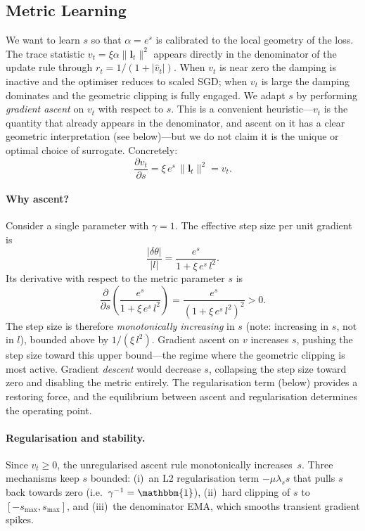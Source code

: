\documentclass{article}
\newcommand{\Id}{\mathbbm{1}}
\newcommand{\vecb}[1]{\boldsymbol{#1}}
\begin{document}
\subsection{Metric Learning}\label{sec:scalar-learning}
We want to learn $s$ so that $\alpha = e^s$ is calibrated to the local geometry of the loss.
The trace statistic $v_t = \xi\alpha\|\vecb{l}_t\|^2$ appears directly in the denominator
of the update rule through $r_t = 1/(1+|\hat{v}_t|)$.
When $v_t$ is near zero the damping is inactive and the optimiser reduces to scaled SGD;
when $v_t$ is large the damping dominates and the geometric clipping is fully engaged.
We adapt $s$ by performing \emph{gradient ascent} on $v_t$ with respect to $s$.
This is a convenient heuristic---$v_t$ is the quantity that already appears in the denominator,
and ascent on it has a clear geometric interpretation (see below)---but
we do not claim it is the unique or optimal choice of surrogate.
Concretely:
$$
    \frac{\partial v_t}{\partial s} = \xi\,e^s\,\|\vecb{l}_t\|^2 = v_t.
$$

\paragraph{Why ascent?}
Consider a single parameter with $\gamma=1$.
The effective step size per unit gradient is
\begin{equation}\label{eq:step-per-grad}
    \frac{|\delta\theta|}{|l|} = \frac{e^s}{1 + \xi\,e^s\,l^2}.
\end{equation}
Its derivative with respect to the metric parameter $s$ is
\begin{equation}\label{eq:step-deriv}
    \frac{\partial}{\partial s}\!\left(\frac{e^s}{1 + \xi\,e^s\,l^2}\right)
    = \frac{e^s}{(1 + \xi\,e^s\,l^2)^2} > 0.
\end{equation}
The step size is therefore \emph{monotonically increasing} in $s$
(note: increasing in $s$, not in $l$),
bounded above by $1/(\xi\,l^2)$.
Gradient ascent on $v$ increases $s$, pushing the step size toward this
upper bound---the regime where the geometric clipping is most active.
Gradient \emph{descent} would decrease $s$, collapsing the step size toward zero
and disabling the metric entirely.
The regularisation term (below) provides a restoring force,
and the equilibrium between ascent and regularisation determines the operating point.

\paragraph{Regularisation and stability.}
Since $v_t\ge 0$, the unregularised ascent rule monotonically increases~$s$.
Three mechanisms keep $s$ bounded:
(i)~an L2 regularisation term $-\mu\lambda_s s$ that pulls $s$ back towards zero (i.e.\ $\gamma^{-1}=\Id$),
(ii)~hard clipping of $s$ to $[-s_{\max}, s_{\max}]$, and
(iii)~the denominator EMA, which smooths transient gradient spikes.
\end{document}
